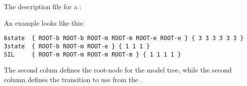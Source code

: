 
\section{}

The description file for a :

An example looks like this:

\begin{verbatim}
6state  { ROOT-b ROOT-b ROOT-m ROOT-m ROOT-e ROOT-e } { 3 3 3 3 3 3 }
3state  { ROOT-b ROOT-m ROOT-e } { 1 1 1 }
SIL     { ROOT-m ROOT-m ROOT-m ROOT-m } { 1 1 1 1 }
\end{verbatim}

The second colum defines the root-node for the model tree, while the
second column defines the transition to use from the .

